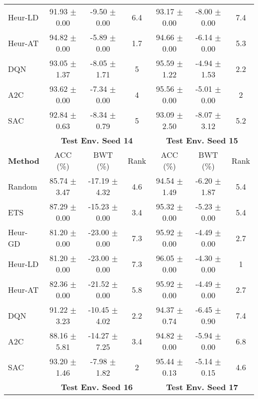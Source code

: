 \begin{tabular}{lcccccc}
	Heur-LD         & 91.93 $\pm$ 0.00    & -9.50 $\pm$ 0.00    & 6.4    & 93.17 $\pm$ 0.00    & -8.00 $\pm$ 0.00    & 7.4    \\
	Heur-AT         & 94.82 $\pm$ 0.00    & -5.89 $\pm$ 0.00    & 1.7    & 94.66 $\pm$ 0.00    & -6.14 $\pm$ 0.00    & 5.3    \\
	DQN             & 93.05 $\pm$ 1.37    & -8.05 $\pm$ 1.71    & 5      & 95.59 $\pm$ 1.22    & -4.94 $\pm$ 1.53    & 2.2    \\
	A2C             & 93.62 $\pm$ 0.00    & -7.34 $\pm$ 0.00    & 4      & 95.56 $\pm$ 0.00    & -5.01 $\pm$ 0.00    & 2      \\
	SAC             & 92.84 $\pm$ 0.63    & -8.34 $\pm$ 0.79    & 5      & 93.09 $\pm$ 2.50    & -8.07 $\pm$ 3.12    & 5.2    \\
	\midrule 
	& \multicolumn{3}{c}{\textbf{Test Env. Seed 14}} & \multicolumn{3}{c}{\textbf{Test Env. Seed 15}} \\
	\cmidrule(lr){2-4} \cmidrule(lr){5-7}
	\textbf{Method} & ACC (\%)          & BWT (\%)          & Rank   & ACC (\%)          & BWT (\%)          & Rank   \\ 
	\midrule 
	Random          & 85.74 $\pm$ 3.47    & -17.19 $\pm$ 4.32   & 4.6    & 94.54 $\pm$ 1.49    & -6.20 $\pm$ 1.87    & 5.4    \\
	ETS             & 87.29 $\pm$ 0.00    & -15.23 $\pm$ 0.00   & 3.4    & 95.32 $\pm$ 0.00    & -5.23 $\pm$ 0.00    & 5.4    \\
	Heur-GD         & 81.20 $\pm$ 0.00    & -23.00 $\pm$ 0.00   & 7.3    & 95.92 $\pm$ 0.00    & -4.49 $\pm$ 0.00    & 2.7    \\
	Heur-LD         & 81.20 $\pm$ 0.00    & -23.00 $\pm$ 0.00   & 7.3    & 96.05 $\pm$ 0.00    & -4.30 $\pm$ 0.00    & 1      \\
	Heur-AT         & 82.36 $\pm$ 0.00    & -21.52 $\pm$ 0.00   & 5.8    & 95.92 $\pm$ 0.00    & -4.49 $\pm$ 0.00    & 2.7    \\
	DQN             & 91.22 $\pm$ 3.23    & -10.45 $\pm$ 4.02   & 2.2    & 94.37 $\pm$ 0.74    & -6.45 $\pm$ 0.90    & 7.4    \\
	A2C             & 88.16 $\pm$ 5.81    & -14.27 $\pm$ 7.25   & 3.4    & 94.82 $\pm$ 0.00    & -5.94 $\pm$ 0.00    & 6.8    \\
	SAC             & 93.20 $\pm$ 1.46    & -7.98 $\pm$ 1.82    & 2      & 95.44 $\pm$ 0.13    & -5.14 $\pm$ 0.15    & 4.6    \\ 
	\midrule 
	& \multicolumn{3}{c}{\textbf{Test Env. Seed 16}} & \multicolumn{3}{c}{\textbf{Test Env. Seed 17}} \\ 

\end{tabular}
